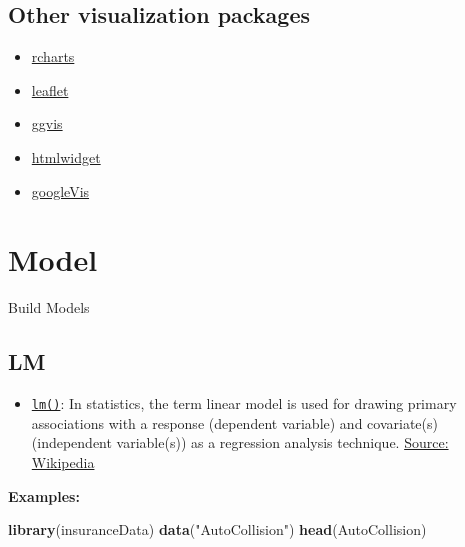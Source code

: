 \documentclass[]{book}
\newenvironment{Shaded}{\begin{snugshade}}{\end{snugshade}}
\newcommand{\KeywordTok}[1]{\textcolor[rgb]{0.13,0.29,0.53}{\textbf{{#1}}}}
\newcommand{\StringTok}[1]{\textcolor[rgb]{0.31,0.60,0.02}{{#1}}}
\newcommand{\NormalTok}[1]{{#1}}
\providecommand{\tightlist}{%
  \setlength{\itemsep}{0pt}\setlength{\parskip}{0pt}}
\begin{document}
\hypertarget{htmlwidget-7c1f63ec90ec6edcb56c}{}

\section{\texorpdfstring{\textbf{Other visualization
packages}}{Other visualization packages}}\label{other-visualization-packages}

\begin{itemize}
\tightlist
\item
  \href{http://ramnathv.github.io/rCharts/}{rcharts}
\item
  \href{https://rstudio.github.io/leaflet/}{leaflet}
\item
  \href{http://ggvis.rstudio.com/}{ggvis}
\item
  \href{http://www.htmlwidgets.org/}{htmlwidget}
\item
  \href{https://cran.r-project.org/web/packages/googleVis/vignettes/googleVis_examples.html}{googleVis}
\end{itemize}

\chapter{Model}\label{model}

Build Models

\section{\texorpdfstring{\textbf{LM}}{LM}}\label{lm}

\begin{itemize}
\tightlist
\item
  \href{https://stat.ethz.ch/R-manual/R-devel/library/stats/html/lm.html}{\texttt{lm()}}:
  In statistics, the term linear model is used for drawing primary
  associations with a response (dependent variable) and covariate(s)
  (independent variable(s)) as a regression analysis technique.
  \href{https://en.wikipedia.org/wiki/Linear_model}{Source: Wikipedia}
\end{itemize}

\textbf{Examples:}

\begin{Shaded}
\begin{Highlighting}[]
\KeywordTok{library}\NormalTok{(insuranceData)}
\KeywordTok{data}\NormalTok{(}\StringTok{"AutoCollision"}\NormalTok{)}
\KeywordTok{head}\NormalTok{(AutoCollision)}
\end{Highlighting}
\end{Shaded}
\end{document}
